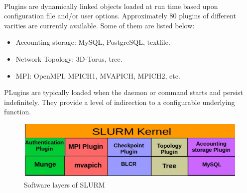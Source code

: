 \documentclass[a4paper, 12pt]{article}
\begin{document}
\noindent
\\
Plugins are dynamically linked objects loaded at run time based upon configuration file and/or user options. Approximately $80$ plugins of different varities are currently available. Some of them are listed below:\\
\begin{itemize}
\item Accounting storage: MySQL, PostgreSQL, textfile.
\item Network Topology: 3D-Torus, tree.
\item MPI: OpenMPI, MPICH1, MVAPICH, MPICH2, etc.
\end{itemize} 
PLugins are typically loaded when the daemon or command starts and persist indefinitely. They provide a level of indirection to a configurable underlying function.
\begin{figure}[h]
\centering
\includegraphics[width=1.0\textwidth]{./plugin.eps}
\vspace{-0.15in}
\caption{Software layers of SLURM}
\label{fig:6}
\end{figure}
\end{document}
